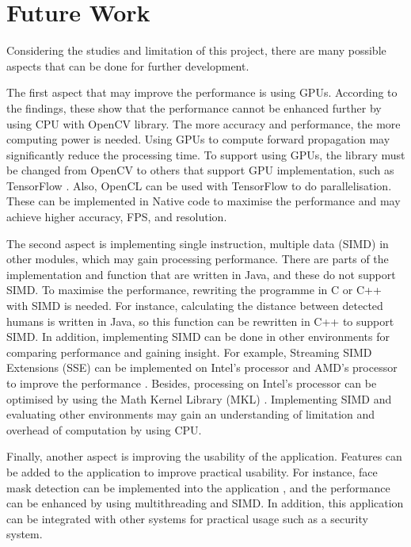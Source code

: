     \section{Future Work}
    Considering the studies and limitation of this project,
    there are many possible aspects that can be done for further development.

    The first aspect that may improve the performance is using GPUs.
        According to the findings, these show that the performance cannot be enhanced further by using CPU with OpenCV library.
        The more accuracy and performance, the more computing power is needed.
        Using GPUs to compute forward propagation may significantly reduce the processing time.
        To support using GPUs, the library must be changed from OpenCV to others that support
        GPU implementation, such as TensorFlow \cite{tensorflow2015-whitepaper}.
        Also, OpenCL can be used with TensorFlow to do parallelisation.
        These can be implemented in Native code to maximise the performance
        and may achieve higher accuracy, FPS, and resolution.

    The second aspect is implementing single instruction, multiple data (SIMD) in other modules,
        which may gain processing performance.
        There are parts of the implementation and function that are written in Java, and these do not support SIMD.
        To maximise the performance, rewriting the programme in C or C++ with SIMD is needed.
        For instance, calculating the distance between detected humans is written in Java,
        so this function can be rewritten in C++ to support SIMD.
        In addition, implementing SIMD can be done in other environments for comparing performance and gaining insight.
        For example, Streaming SIMD Extensions (SSE) can be implemented on Intel's processor and AMD's processor to improve the performance \cite{intel-sse}.
        Besides, processing on Intel's processor can be optimised by using the Math Kernel Library (MKL) \cite{intel-alt}.
        Implementing SIMD and evaluating other environments may gain an understanding of limitation and overhead of computation by using CPU.

    Finally, another aspect is improving the usability of the application.
        Features can be added to the application to improve practical usability.
        For instance, face mask detection can be implemented into the application \cite{facemask-detection},
        and the performance can be enhanced by using multithreading and SIMD.
        In addition, this application can be integrated with other systems
        for practical usage such as a security system.